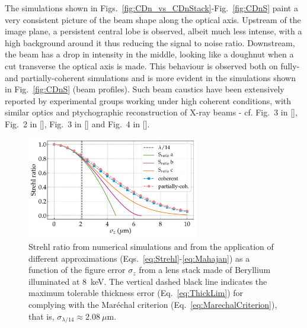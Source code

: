 \begin{refsection}
The simulations shown in Figs.~\ref{fig:CDn_vs_CDnStack}-Fig.~\ref{fig:CDnS} paint a very consistent picture of the beam shape along the optical axis. Upstream of the image plane, a persistent central lobe is observed, albeit much less intense, with a high background around it thus reducing the signal to noise ratio. Downstream, the beam has a drop in intensity in the middle, looking like a doughnut when a cut transverse the optical axis is made. This behaviour is observed both on fully- and partially-coherent simulations and is more evident in the simulations shown in Fig.~\ref{fig:CDnS} (beam profiles). Such beam caustics have been extensively reported by experimental groups working under high coherent conditions, with similar optics and ptychographic reconstruction of X-ray beams - cf. Fig.~3 in [\cite{Schropp2013}], Fig.~2 in [\cite{Seiboth2016}], Fig.~3 in [\cite{Gasilov2017}] and Fig.~4 in [\cite{Seiboth2020}].


\begin{figure}[t]
    \centering
    \includegraphics[width=7.5cm]{figures/ch05/fig_10.pdf} %
    \caption[Strehl ratio from numerical simulations]{Strehl ratio from numerical simulations and from the application of different approximations (Eqs.~\ref{eq:Strehl}-\ref{eq:Mahajan}) as a function of the figure error $\sigma_z$ from a lens stack made of Beryllium illuminated at 8~keV. The vertical dashed black line indicates the maximum tolerable thickness error (Eq.~\ref{eq:ThickLim}) for complying with the Mar\'echal criterion (Eq.~\ref{eq:MarechalCriterion}), that is, $\sigma_{\lambda/14}\approx2.08~\mu\text{m}$.}
    \label{fig:Strehl}
\end{figure}{}


\end{refsection}
